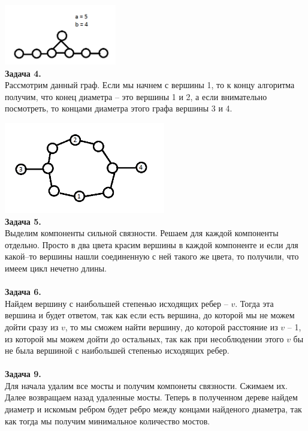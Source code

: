 \documentclass[12pt,a4paper]{scrartcl}
\begin{document}
	\includegraphics[weight=100, height = 100]{fffff.png}
	\\
	\newpage
	\noindent
	\textbf{Задача 4.} \\
	Рассмотрим данный граф. Если мы начнем с вершины 1, то к концу алгоритма получим, что конец диаметра -- это вершины 1 и 2, а если внимательно посмотреть, то концами диаметра этого графа вершины 3 и 4. 
	
	\includegraphics[weight=200, height = 150]{f.png}
	\\
	\textbf{Задача 5.} \\
	Выделим компоненты сильной связности. Решаем для каждой компоненты отдельно. Просто в два цвета красим вершины в каждой компоненте и если для какой--то вершины нашли соединенную с ней такого же цвета, то получили, что имеем цикл нечетно длины. \\
	\\
	\textbf{Задача 6.} \\
	Найдем вершину с наибольшей степенью исходящих ребер -- $v$. Тогда эта вершина и будет ответом, так как если есть вершина, до которой мы не можем дойти сразу из $v$, то мы сможем найти вершину, до которой расстояние из $v$ -- 1, из которой мы можем дойти до остальных, так как при несоблюдении этого $v$ бы не была вершиной с наибольшей степенью исходящих ребер.\\
	\\
	\textbf{Задача 9.} \\
	Для начала удалим все мосты и получим компонеты связности. Сжимаем их. Далее возвращаем назад удаленные мосты. Теперь в полученном дереве найдем диаметр и искомым ребром будет ребро между концами найденого диаметра, так как тогда мы получим минимальное количество мостов.
	
\end{document}
